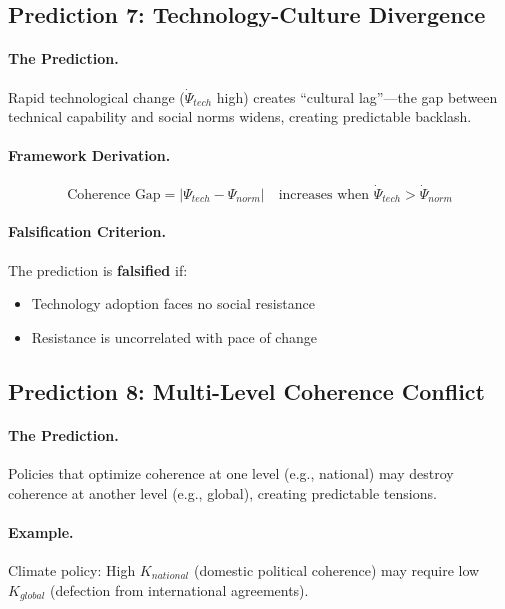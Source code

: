 \documentclass[12pt,a4paper]{article}
\begin{document}
\subsection{Prediction 7: Technology-Culture Divergence}

\paragraph{The Prediction.}
Rapid technological change ($\dot{\Psi}_{tech}$ high) creates ``cultural lag''---the gap between technical capability and social norms widens, creating predictable backlash.

\paragraph{Framework Derivation.}
\begin{equation}
    \text{Coherence Gap} = |\Psi_{tech} - \Psi_{norm}| \quad \text{increases when } \dot{\Psi}_{tech} > \dot{\Psi}_{norm}
\end{equation}

\paragraph{Falsification Criterion.}
The prediction is \textbf{falsified} if:
\begin{itemize}
    \item Technology adoption faces no social resistance
    \item Resistance is uncorrelated with pace of change
\end{itemize}

\subsection{Prediction 8: Multi-Level Coherence Conflict}

\paragraph{The Prediction.}
Policies that optimize coherence at one level (e.g., national) may destroy coherence at another level (e.g., global), creating predictable tensions.

\paragraph{Example.}
Climate policy: High $K_{national}$ (domestic political coherence) may require low $K_{global}$ (defection from international agreements).
\end{document}
